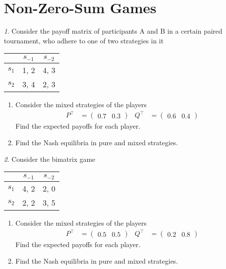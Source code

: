 \documentclass[12pt]{article}
\theoremstyle{remark}
\newtheorem{exercise}{}[subsection]
\begin{document}
\section{Non-Zero-Sum Games}

\begin{exercise}
Consider the payoff matrix of participants A and B in a certain paired tournament,
who adhere to one of two strategies in it
\begin{center}
	\begin{tabular}{|c||c|c|}
	\hline
	& $s_{-1}$ & $s_{-2}$  \\ \hline \hline
	$s_1$ & 1, 2 & 4, 3  \\ \hline
	$s_2$ & 3, 4 & 2, 3  \\ %
	\hline
	\end{tabular}
\end{center}
\begin{enumerate}
	\item Consider the mixed strategies of the players
	\begin{align*}
		P^\top&=\begin{pmatrix} 0.7 & 0.3 \end{pmatrix} &
		Q^\top&=\begin{pmatrix} 0.6 & 0.4 \end{pmatrix}
	\end{align*}
	Find the expected payoffs for each player.
	\item Find the Nash equilibria in pure and mixed strategies.
\end{enumerate}
\end{exercise}

\begin{exercise}
Consider the bimatrix game
\begin{center}
	\begin{tabular}{|c||c|c|}
	\hline
	& $s_{-1}$ & $s_{-2}$  \\ \hline \hline
	$s_1$ & 4, 2 & 2, 0  \\ \hline
	$s_2$ & 2, 2 & 3, 5  \\ %
	\hline
	\end{tabular}
\end{center}
\begin{enumerate}
	\item Consider the mixed strategies of the players
	\begin{align*}
		P^\top&=\begin{pmatrix} 0.5 & 0.5 \end{pmatrix} &
		Q^\top&=\begin{pmatrix} 0.2 & 0.8 \end{pmatrix}
	\end{align*}
	Find the expected payoffs for each player.
	\item Find the Nash equilibria in pure and mixed strategies.
\end{enumerate}
\end{exercise}
\end{document}
